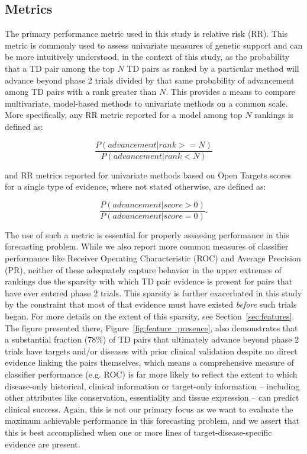 \documentclass{article}
\begin{document}
\subsection{Metrics}
\label{sec:metrics}

The primary performance metric used in this study is relative risk (RR). This metric is commonly used to assess univariate measures of genetic support \cite{Nelson2015-eg,King2019-rc,Minikel2023.06.23.23291765} and can be more intuitively understood, in the context of this study, as the probability that a TD pair among the top $N$ TD pairs as ranked by a particular method will advance beyond phase 2 trials divided by that same probability of advancement among TD pairs with a rank greater than $N$. This provides a means to compare multivariate, model-based methods to univariate methods on a common scale. More specifically, any RR metric reported for a model among top $N$ rankings is defined as:

\begin{equation}
  \frac{P(advancement | rank >= N)}{P(advancement | rank < N)}
\end{equation}

and RR metrics reported for univariate methods based on Open Targets scores for a single type of evidence, where not stated otherwise, are defined as:

\begin{equation}
  \frac{P(advancement | score > 0)}{P(advancement | score = 0)}.
\end{equation}

The use of such a metric is essential for properly assessing performance in this forecasting problem. While we also report more common measures of classifier performance like Receiver Operating Characteristic (ROC) and Average Precision (PR), neither of these adequately capture behavior in the upper extremes of rankings due the sparsity with which TD pair evidence is present for pairs that have ever entered phase 2 trials. This sparsity is further exacerbated in this study by the constraint that most of that evidence must have existed \textit{before} such trials began. For more details on the extent of this sparsity, see Section~\ref{sec:features}. The figure presented there, Figure~\ref{fig:feature_presence}, also demonstrates that a substantial fraction (78\%) of TD pairs that ultimately advance beyond phase 2 trials have targets and/or diseases with prior clinical validation despite no direct evidence linking the pairs themselves, which means a comprehensive measure of classifier performance (e.g. ROC) is far more likely to reflect the extent to which disease-only historical, clinical information or target-only information -- including other attributes like conservation, essentiality and tissue expression -- can predict clinical success. Again, this is not our primary focus as we want to evaluate the maximum achievable performance in this forecasting problem, and we assert that this is best accomplished when one or more lines of target-disease-specific evidence are present.
\end{document}
